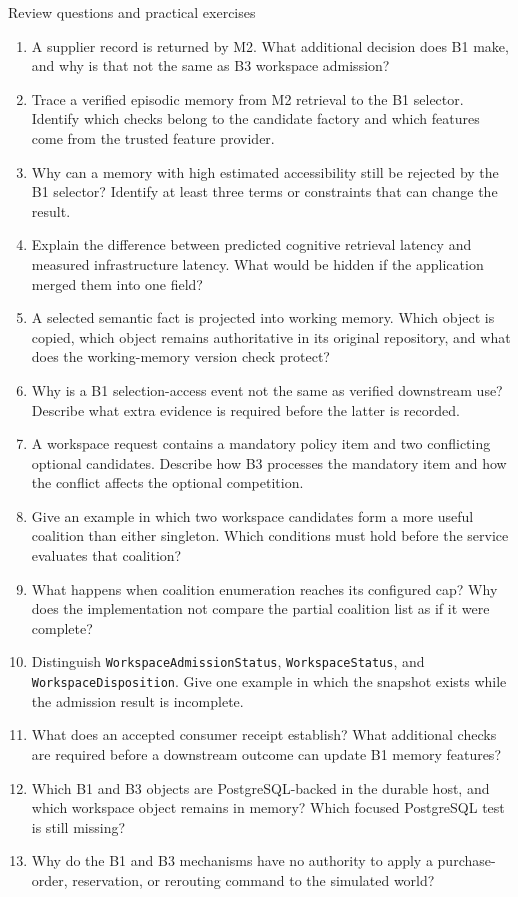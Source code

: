 \begin{reviewquestions}{Review questions and practical exercises}
\begin{enumerate}
  \item A supplier record is returned by M2. What additional decision does B1 make, and why is that not the same as B3 workspace admission?
  \item Trace a verified episodic memory from M2 retrieval to the B1 selector. Identify which checks belong to the candidate factory and which features come from the trusted feature provider.
  \item Why can a memory with high estimated accessibility still be rejected by the B1 selector? Identify at least three terms or constraints that can change the result.
  \item Explain the difference between predicted cognitive retrieval latency and measured infrastructure latency. What would be hidden if the application merged them into one field?
  \item A selected semantic fact is projected into working memory. Which object is copied, which object remains authoritative in its original repository, and what does the working-memory version check protect?
  \item Why is a B1 selection-access event not the same as verified downstream use? Describe what extra evidence is required before the latter is recorded.
  \item A workspace request contains a mandatory policy item and two conflicting optional candidates. Describe how B3 processes the mandatory item and how the conflict affects the optional competition.
  \item Give an example in which two workspace candidates form a more useful coalition than either singleton. Which conditions must hold before the service evaluates that coalition?
  \item What happens when coalition enumeration reaches its configured cap? Why does the implementation not compare the partial coalition list as if it were complete?
  \item Distinguish \texttt{Workspace\allowbreak{}Admission\allowbreak{}Status}, \texttt{WorkspaceStatus}, and \texttt{Workspace\allowbreak{}Disposition}. Give one example in which the snapshot exists while the admission result is incomplete.
  \item What does an accepted consumer receipt establish? What additional checks are required before a downstream outcome can update B1 memory features?
  \item Which B1 and B3 objects are PostgreSQL-backed in the durable host, and which workspace object remains in memory? Which focused PostgreSQL test is still missing?
  \item Why do the B1 and B3 mechanisms have no authority to apply a purchase-order, reservation, or rerouting command to the simulated world?
\end{enumerate}


\end{reviewquestions}
